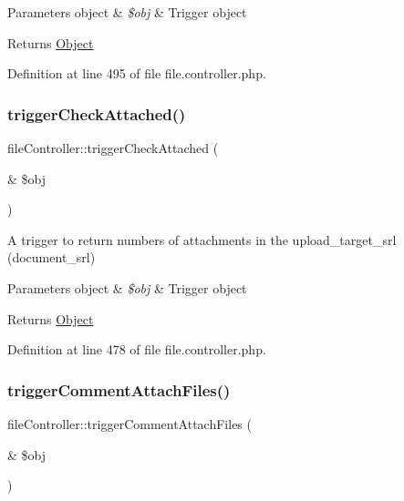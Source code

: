 \begin{DoxyParams}[1]{Parameters}
object & {\em \$obj} & Trigger object \\
\hline
\end{DoxyParams}
\begin{DoxyReturn}{Returns}
\hyperlink{classObject}{Object} 
\end{DoxyReturn}


Definition at line 495 of file file.\+controller.\+php.

\mbox{\label{classfileController_ab23c495b5b662264a1c7adfda86f715f}} 
\subsubsection{\texorpdfstring{trigger\+Check\+Attached()}{triggerCheckAttached()}}
{\footnotesize\ttfamily file\+Controller\+::trigger\+Check\+Attached (\begin{DoxyParamCaption}\item[{\&}]{\$obj }\end{DoxyParamCaption})}

A trigger to return numbers of attachments in the upload\+\_\+target\+\_\+srl (document\+\_\+srl)


\begin{DoxyParams}[1]{Parameters}
object & {\em \$obj} & Trigger object \\
\hline
\end{DoxyParams}
\begin{DoxyReturn}{Returns}
\hyperlink{classObject}{Object} 
\end{DoxyReturn}


Definition at line 478 of file file.\+controller.\+php.

\mbox{\label{classfileController_ab25a513258ef9c9e2dc2af274c9c24e7}} 
\subsubsection{\texorpdfstring{trigger\+Comment\+Attach\+Files()}{triggerCommentAttachFiles()}}
{\footnotesize\ttfamily file\+Controller\+::trigger\+Comment\+Attach\+Files (\begin{DoxyParamCaption}\item[{\&}]{\$obj }\end{DoxyParamCaption})}


